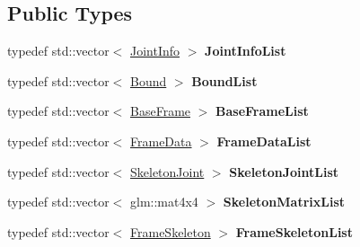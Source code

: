 \subsection*{Public Types}
\begin{DoxyCompactItemize}
\item 
typedef std\+::vector$<$ \hyperlink{struct_m_d5_animation_1_1_joint_info}{Joint\+Info} $>$ {\bfseries Joint\+Info\+List}\hypertarget{class_m_d5_animation_a50328410a36f2445b6c03b7c1e8d2934}{}\label{class_m_d5_animation_a50328410a36f2445b6c03b7c1e8d2934}

\item 
typedef std\+::vector$<$ \hyperlink{struct_m_d5_animation_1_1_bound}{Bound} $>$ {\bfseries Bound\+List}\hypertarget{class_m_d5_animation_acbfdd9a96988ec0978732e0216a7f98f}{}\label{class_m_d5_animation_acbfdd9a96988ec0978732e0216a7f98f}

\item 
typedef std\+::vector$<$ \hyperlink{struct_m_d5_animation_1_1_base_frame}{Base\+Frame} $>$ {\bfseries Base\+Frame\+List}\hypertarget{class_m_d5_animation_afaabb682bcec86356fad3c41650737fc}{}\label{class_m_d5_animation_afaabb682bcec86356fad3c41650737fc}

\item 
typedef std\+::vector$<$ \hyperlink{struct_m_d5_animation_1_1_frame_data}{Frame\+Data} $>$ {\bfseries Frame\+Data\+List}\hypertarget{class_m_d5_animation_affa602032e56507139361d8678c7627e}{}\label{class_m_d5_animation_affa602032e56507139361d8678c7627e}

\item 
typedef std\+::vector$<$ \hyperlink{struct_m_d5_animation_1_1_skeleton_joint}{Skeleton\+Joint} $>$ {\bfseries Skeleton\+Joint\+List}\hypertarget{class_m_d5_animation_a22c12c62b7f4dbcf1075e531c00664d7}{}\label{class_m_d5_animation_a22c12c62b7f4dbcf1075e531c00664d7}

\item 
typedef std\+::vector$<$ glm\+::mat4x4 $>$ {\bfseries Skeleton\+Matrix\+List}\hypertarget{class_m_d5_animation_a3d6e12b4976ff212c795ac234bb0c872}{}\label{class_m_d5_animation_a3d6e12b4976ff212c795ac234bb0c872}

\item 
typedef std\+::vector$<$ \hyperlink{struct_m_d5_animation_1_1_frame_skeleton}{Frame\+Skeleton} $>$ {\bfseries Frame\+Skeleton\+List}\hypertarget{class_m_d5_animation_a1afa822d89f7aa1bbb5de1d31e12639b}{}\label{class_m_d5_animation_a1afa822d89f7aa1bbb5de1d31e12639b}

\end{DoxyCompactItemize}
